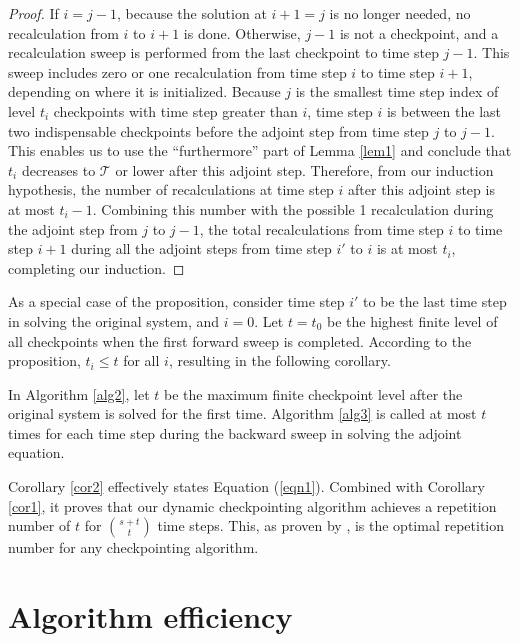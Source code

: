 \documentclass[oneeqnum, onethmnum, onefignum, onetabnum]{siamltex}
\begin{document}
\begin{proof}
If $i = j - 1$, because the solution at $i + 1 = j$ is no longer needed, no
recalculation from $i$ to $i + 1$ is done.  Otherwise, $j - 1$ is not
a checkpoint, and a recalculation sweep is performed from the last checkpoint
to time step $j - 1$.  This sweep includes zero or one recalculation from time
step $i$ to time step $i + 1$, depending on where it is initialized.  
Because $j$ is the smallest time step index of level $t_i$ checkpoints with
time step greater than $i$, time step $i$ is between the last two indispensable
checkpoints before the adjoint step from time step $j$ to $j - 1$.
This enables us to use the ``furthermore'' part of Lemma \ref{lem1} and
conclude that $t_i$ decreases to $\mathcal{T}$ or lower after this adjoint
step.  Therefore, from our induction hypothesis, the number of recalculations
at time step $i$ after this adjoint step is at most $t_i - 1$.
Combining this
number with the possible 1 recalculation during the adjoint step from $j$ to
$j - 1$, the total recalculations from time step $i$ to time step $i + 1$
during all the adjoint steps from time step $i'$ to $i$ is at most $t_i$,
completing our induction.
\end{proof}

As a special case of the proposition, consider time step $i'$ to be the last
time step in solving the original system, and $i = 0$.  Let $t = t_0$ be
the highest finite level of all checkpoints when the first forward sweep is
completed.  According to the proposition, $t_i \le t$ for all $i$,
resulting in the following corollary.

\begin{corollary} \label{cor2}
    In Algorithm \ref{alg2}, let $t$ be the maximum finite checkpoint level
    after the original system is solved for the first time.  Algorithm
    \ref{alg3} is called at most $t$ times for each time step during the
    backward sweep in solving the adjoint equation.
\end{corollary}

Corollary \ref{cor2} effectively states Equation (\ref{eqn1}).  Combined with
Corollary \ref{cor1}, it proves that our dynamic checkpointing algorithm
achieves a repetition number of $t$ for $\binom{s + t}{t}$
time steps.  This, as proven by \cite{griewank92}, is the optimal
repetition number for any checkpointing algorithm.




\section{Algorithm efficiency} \label{sec_perf}
\end{document}
